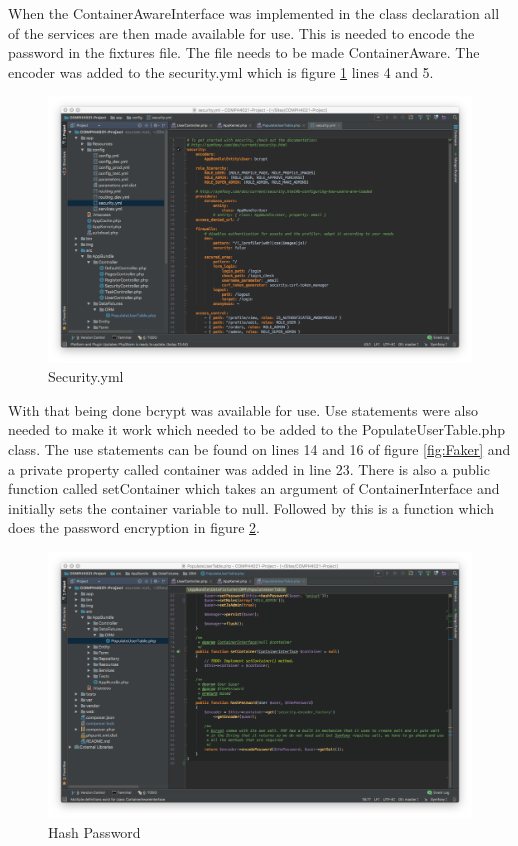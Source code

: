 When the ContainerAwareInterface was implemented in the class declaration all of the services are then made available for use. This is needed to encode the password in the fixtures file. The file needs to be made ContainerAware. The encoder was added to the security.yml which is figure \ref{fig:Security.yml} lines 4 and 5.

\begin{figure}[htbp]
   \centering
   \includegraphics[width=400pt]{figures/security_yml.png} %
   \caption{Security.yml}
   \label{fig:Security.yml}
\end{figure}

With that being done bcrypt was available for use. Use statements were also needed to make it work which needed to be added to the PopulateUserTable.php class. The use statements can be found on lines 14 and 16 of figure \ref{fig:Faker} and a private property called container was added in line 23. There is also a public function called setContainer which takes an argument of ContainerInterface and initially sets the container variable to null. Followed by this is a function which does the password encryption in figure \ref{fig:Hash Password}.

\begin{figure}[htbp]
   \centering
   \includegraphics[width=400pt]{figures/hash_password.png} %
   \caption{Hash Password}
   \label{fig:Hash Password}
\end{figure}


